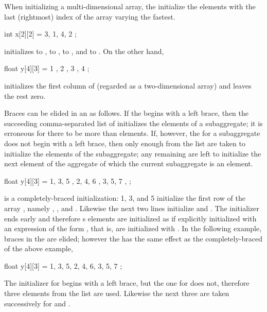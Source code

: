 \pnum
When initializing a multi-dimensional array,
the
initialize the elements with the last (rightmost) index of the array
varying the fastest.
\begin{example}

\begin{codeblock}
int x[2][2] = { 3, 1, 4, 2 };
\end{codeblock}

initializes
to
,
to
,
to
,
and
to
.
On the other hand,

\begin{codeblock}
float y[4][3] = {
  { 1 }, { 2 }, { 3 }, { 4 }
};
\end{codeblock}

initializes the first column of
(regarded as a two-dimensional array)
and leaves the rest zero.
\end{example}

\pnum
Braces can be elided in an
as follows.
If the
begins with a left brace,
then the succeeding comma-separated list of
initializes the elements of a subaggregate;
it is erroneous for there to be more
than elements.
If, however, the
for a subaggregate does not begin with a left brace,
then only enough
from the list are taken to initialize the elements of the subaggregate;
any remaining
are left to initialize the next element of the aggregate
of which the current subaggregate is an element.
\begin{example}

\begin{codeblock}
float y[4][3] = {
  { 1, 3, 5 },
  { 2, 4, 6 },
  { 3, 5, 7 },
};
\end{codeblock}

is a completely-braced initialization:
1, 3, and 5 initialize the first row of the array
,
namely
,
,
and
.
Likewise the next two lines initialize
and
.
The initializer ends early and therefore
s
elements are initialized as if explicitly initialized with an
expression of the form
,
that is, are initialized with
.
In the following example, braces in the
are elided;
however the
has the same effect as the completely-braced
of the above example,

\begin{codeblock}
float y[4][3] = {
  1, 3, 5, 2, 4, 6, 3, 5, 7
};
\end{codeblock}

The initializer for
begins with a left brace, but the one for
does not,
therefore three elements from the list are used.
Likewise the next three are taken successively for
and
.
\end{example}

